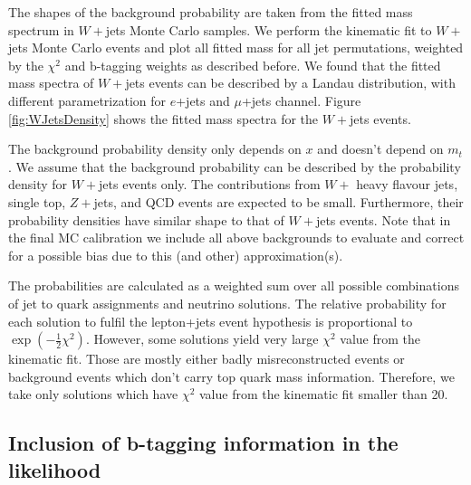 The shapes of the background probability are taken from the fitted mass spectrum in $W+$jets Monte Carlo samples. We
perform the kinematic fit to $W+$jets Monte Carlo events and plot all fitted mass for all jet permutations, weighted by
the $\chi^{2}$ and b-tagging weights as described before.  We found that the fitted mass spectra of $W+$jets events can
be described by a Landau distribution, with different parametrization for $e$+jets and $\mu$+jets channel.  Figure
\ref{fig:WJetsDensity} shows the fitted mass spectra for the $W+$jets events.


The background probability density only depends on $x$ and doesn't depend on $m_{t}$.  We assume that the background
probability can be described by the probability density for $W+$jets events only. The contributions from $W+$ heavy
flavour jets, single top, $Z+$jets, and QCD events are expected to be small.  Furthermore, their probability densities
have similar shape to that of $W+$jets events. Note that in the final MC calibration we include all above backgrounds to
evaluate and correct for a possible bias due to this (and other) approximation(s).

The probabilities are calculated as a weighted sum over all possible combinations of jet to quark assignments and
neutrino solutions.  The relative probability for each solution to fulfil the \ttbar lepton+jets event hypothesis
is proportional to $\exp\left(-\frac{1}{2}\chi^{2}\right)$.  However, some solutions yield very large $\chi^{2}$ value
from the kinematic fit. Those are mostly either badly misreconstructed events or background events which don't carry top
quark mass information.  Therefore, we take only solutions which have $\chi^{2}$ value from the kinematic fit smaller
than 20.


\subsection{Inclusion of b-tagging information in the likelihood}

